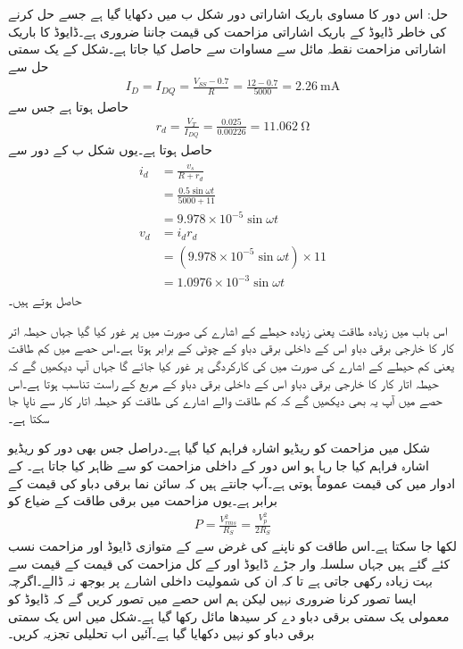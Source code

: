حل:	اس دور کا مساوی باریک اشاراتی دور شکل  ب میں دکھایا گیا ہے جسے حل کرنے کی خاطر ڈایوڈ کے باریک اشاراتی مزاحمت   کی قیمت جاننا ضروری ہے۔ڈایوڈ کا باریک اشاراتی مزاحمت نقطہ مائل سے مساوات   سے حاصل کیا جاتا ہے۔شکل   کے یک سمتی حل سے
\begin{align}
I_D=I_{DQ}=\frac{V_{SS}-0.7}{R}=\frac{12-0.7}{5000}=\SI{2.26}{\milli \ampere}
\end{align}
حاصل ہوتا ہے جس سے
\begin{align}
r_d = \frac{V_T}{I_{DQ}}=\frac{0.025}{0.00226}=\SI{11.062}{\ohm}
\end{align}
حاصل ہوتا ہے۔یوں شکل  ب کے دور سے 
\begin{gather}
\begin{aligned}
i_d &= \frac{v_s}{R+r_d} \\
&=\frac{0.5 \sin \omega t}{5000+11} \\
&=9.978 \times 10^{-5} \sin \omega t\\
v_d &=i_d r_d \\
&= (9.978 \times 10^{-5} \sin \omega t) \times 11 \\
&=1.0976 \times 10^{-3} \sin \omega t
\end{aligned}
\end{gather}
حاصل ہوتے ہیں۔

اس باب میں زیادہ طاقت یعنی زیادہ حیطے کے اشارے کی صورت میں  پر غور کیا گیا جہاں حیطہ اتر کار کا خارجی برقی دباو اس کے داخلی برقی دباو کے چوٹی کے برابر ہوتا ہے۔اس حصے میں کم طاقت یعنی کم حیطے کے اشارے کی صورت  میں  کی کارکردگی پر غور کیا جائے گا جہاں آپ دیکھیں گے کہ حیطہ اتار کار کا خارجی برقی دباو اس کے داخلی برقی دباو کے مربع کے راست تناسب ہوتا ہے۔اس حصے میں آپ یہ بھی دیکھیں گے کہ کم طاقت والے اشارے کی طاقت کو حیطہ اتار کار سے ناپا جا سکتا ہے۔ 

شکل  میں مزاحمت  کو ریڈیو اشارہ  فراہم کیا گیا ہے۔دراصل جس بھی دور کو ریڈیو اشارہ فراہم کیا جا رہا ہو اس دور کے داخلی مزاحمت کو  سے ظاہر کیا جاتا ہے۔ کے ادوار میں  کی قیمت عموماً  ہوتی ہے۔آپ جانتے ہیں کہ سائن نما برقی دباو  کی  قیمت  کے برابر ہے۔یوں مزاحمت  میں برقی طاقت کے ضیاع  کو
\begin{align}\label{مساوات_ڈایوڈ_ذرائع_ابلاغ_طاقت_کا_ناپ}
P=\frac{V^2_{rms}}{R_S}=\frac{V_p^2}{2R_S}
\end{align}
لکھا جا سکتا ہے۔اس طاقت کو ناپنے کی غرض سے  کے متوازی ڈایوڈ اور مزاحمت  نسب کئے گئے ہیں جہاں سلسلہ وار جڑے ڈایوڈ اور  کے کل مزاحمت کی قیمت  کے قیمت سے بہت زیادہ رکھی جاتی ہے تا کہ ان کی شمولیت داخلی اشارے پر بوجھ نہ ڈالے۔اگرچہ ایسا تصور کرنا ضروری نہیں لیکن ہم اس حصے میں تصور کریں گے کہ ڈایوڈ کو معمولی یک سمتی برقی دباو دے کر سیدھا مائل رکھا گیا ہے۔شکل میں اس یک سمتی برقی دباو کو نہیں دکھایا گیا ہے۔آئیں اب  تحلیلی تجزیہ کریں۔

